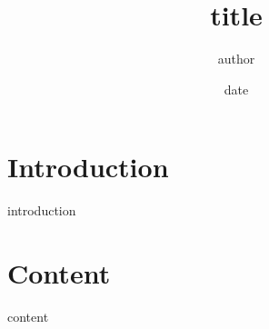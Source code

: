\documentclass{article}
\title{{{title}}}
\author{{{author}}}
\date{{{date}}}
\begin{document}
\maketitle

\section{Introduction}
{{introduction}}

\section{Content}
{{content}}
\end{document}
